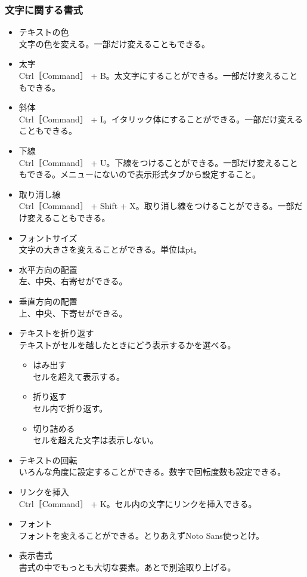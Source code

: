 \documentclass[a4paper]{ltjsreport}
\begin{document}
\subsubsection{文字に関する書式}
\begin{itemize}
  \item テキストの色\\
        文字の色を変える。一部だけ変えることもできる。
  \item 太字\\
        Ctrl［Command］ + B。太文字にすることができる。一部だけ変えることもできる。
  \item 斜体\\
        Ctrl［Command］ + I。イタリック体にすることができる。一部だけ変えることもできる。
  \item 下線\\
        Ctrl［Command］ + U。下線をつけることができる。一部だけ変えることもできる。メニューにないので表示形式タブから設定すること。
  \item 取り消し線\\
        Ctrl［Command］ + Shift + X。取り消し線をつけることができる。一部だけ変えることもできる。
  \item フォントサイズ\\
        文字の大きさを変えることができる。単位はpt。
  \item 水平方向の配置\\
        左、中央、右寄せができる。
  \item 垂直方向の配置\\
        上、中央、下寄せができる。
  \item テキストを折り返す\\
        テキストがセルを越したときにどう表示するかを選べる。
        \begin{itemize}
          \item はみ出す\\
                セルを超えて表示する。
          \item 折り返す\\
                セル内で折り返す。
          \item 切り詰める\\
                セルを超えた文字は表示しない。
        \end{itemize}
  \item テキストの回転\\
        いろんな角度に設定することができる。数字で回転度数も設定できる。
  \item リンクを挿入\\
        Ctrl［Command］ + K。セル内の文字にリンクを挿入できる。
  \item フォント\\
        フォントを変えることができる。とりあえずNoto Sans使っとけ。
  \item 表示書式\\
        書式の中でもっとも大切な要素。あとで別途取り上げる。
\end{itemize}
\end{document}
